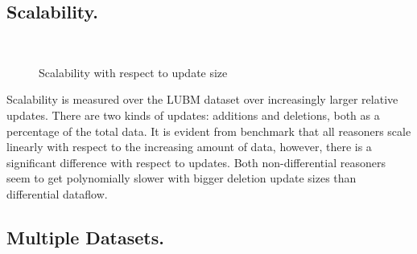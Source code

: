 \documentclass[sigconf,screen,review,natbib]{acmart}
\theoremstyle{definition}
\begin{document}
\subsection{Scalability.}

\begin{figure}[htb!]
	\centering
	\\
	\caption{Scalability with respect to update size}
	\label{benchmark:scalability}
\end{figure}

Scalability is measured over the LUBM dataset over increasingly larger relative updates. There are two kinds of updates: additions and deletions, both as a percentage of the total data. It is evident from benchmark \cite{benchmark:scalability} that all reasoners scale linearly with respect to the increasing amount of data, however, there is a significant difference with respect to updates. Both non-differential reasoners seem to get polynomially slower with bigger deletion update sizes than differential dataflow.

\subsection{Multiple Datasets.}
\end{document}

